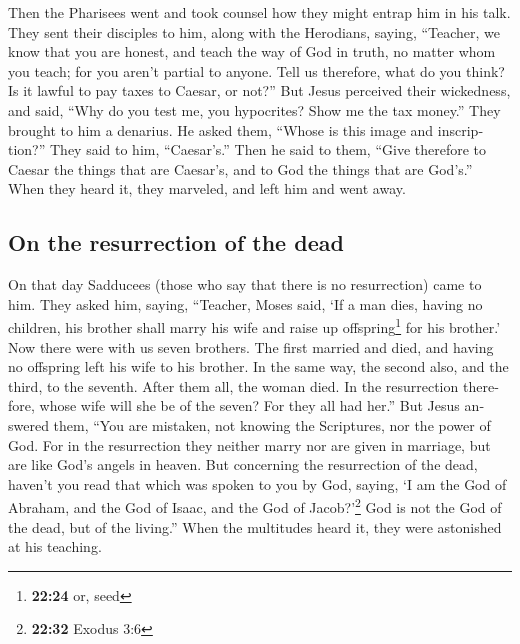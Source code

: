 \begin{paracol}{2}
\begin{otherlanguage}{english}
 Then the Pharisees went and took counsel how they might
entrap him in his talk.  They sent their disciples to
him, along with the Herodians, saying, ``Teacher, we know that you are
honest, and teach the way of God in truth, no matter whom you teach; for
you aren't partial to anyone.  Tell us therefore, what do
you think? Is it lawful to pay taxes to Caesar, or not?''
 But Jesus perceived their wickedness, and said, ``Why do
you test me, you hypocrites?  Show me the tax money.''
They brought to him a denarius.  He asked them, ``Whose
is this image and inscription?''  They said to him,
``Caesar's.'' Then he said to them, ``Give therefore to Caesar the
things that are Caesar's, and to God the things that are God's.''
 When they heard it, they marveled, and left him and went
away.

\hypertarget{on-the-resurrection-of-the-dead}{%
\subsection{On the resurrection of the
dead}\label{on-the-resurrection-of-the-dead}}

 On that day Sadducees (those who say that there is no
resurrection) came to him. They asked him,  saying,
``Teacher, Moses said, `If a man dies, having no children, his brother
shall marry his wife and raise up offspring\footnote{\textbf{22:24} or,
  seed} for his brother.'  Now there were with us seven
brothers. The first married and died, and having no offspring left his
wife to his brother.  In the same way, the second also,
and the third, to the seventh.  After them all, the woman
died.  In the resurrection therefore, whose wife will she
be of the seven? For they all had her.''  But Jesus
answered them, ``You are mistaken, not knowing the Scriptures, nor the
power of God.  For in the resurrection they neither marry
nor are given in marriage, but are like God's angels in heaven.
 But concerning the resurrection of the dead, haven't you
read that which was spoken to you by God, saying,  `I am
the God of Abraham, and the God of Isaac, and the God of
Jacob?'\footnote{\textbf{22:32} Exodus 3:6} God is not the God of the
dead, but of the living.''  When the multitudes heard it,
they were astonished at his teaching.


\end{otherlanguage}
\end{paracol}
